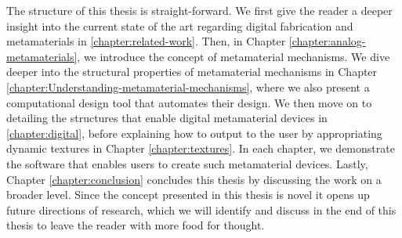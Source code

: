 The structure of this thesis is straight-forward. We first give the reader a deeper insight into the current state of the art regarding digital fabrication and metamaterials in \ref{chapter:related-work}. Then, in Chapter \ref{chapter:analog-metamaterials}, we introduce the concept of metamaterial mechanisms. We dive deeper into the structural properties of metamaterial mechanisms in Chapter \ref{chapter:Understanding-metamaterial-mechanisms}, where we also present a computational design tool that automates their design. We then move on to detailing the structures that enable digital metamaterial devices in \ref{chapter:digital}, before explaining how to output to the user by appropriating dynamic textures in Chapter \ref{chapter:textures}. 
In each chapter, we demonstrate the software that enables users to create such metamaterial devices. 
Lastly, Chapter \ref{chapter:conclusion} concludes this thesis by discussing the work on a broader level. Since the concept presented in this thesis is novel it opens up future directions of research, which we will identify and discuss in the end of this thesis to leave the reader with more food for thought. 























